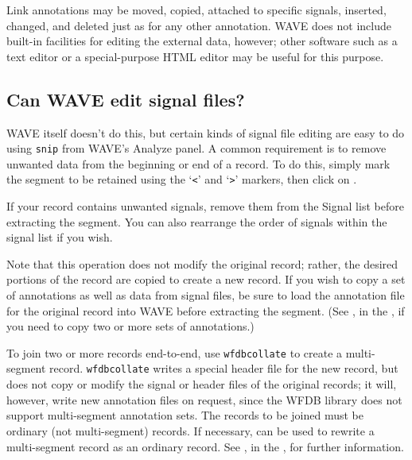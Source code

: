 \documentclass[twoside]{book}
\newcommand{\button}[1]{\cornersize{2}\ovalbox{\rule[-.3mm]{0cm}{2.5mm}\small\sf ~#1~}}
\newcommand{\WAVE}{{\sf WAVE}\xspace}
\begin{document}
Link annotations may be moved, copied, attached to specific signals,
inserted, changed, and deleted just as for any other annotation.
\WAVE{} does not include built-in facilities for editing the external
data, however;  other software such as a text editor or a
special-purpose HTML editor may be useful for this purpose.

\subsection{Can \WAVE{} edit signal files?}

\WAVE{} itself doesn't do this, but certain kinds of signal file editing are
easy to do using {\tt snip} from \WAVE{}'s {\sf Analyze} panel.  A common
requirement is to remove unwanted data from the beginning or end of a record.
To do this, simply mark the segment to be retained using the `{\tt <}' and
`{\tt >}' markers, then click on \button{Extract segment}.

If your record contains unwanted signals, remove them from the {\sf Signal
list} before extracting the segment.  You can also rearrange the order of
signals within the signal list if you wish.

Note that this operation does not modify the original record;  rather, the
desired portions of the record are copied to create a new record.  If you
wish to copy a set of annotations as well as data from signal files, be sure
to load the annotation file for the original record into \WAVE{} before
extracting the segment.  (See
, in the
,
if you need to copy two or more sets of annotations.)

To join two or more records end-to-end, use {\tt wfdbcollate} to create
a multi-segment record.  {\tt wfdbcollate} writes a special header file
for the new record, but does not copy or modify the signal
or header files of the original records;  it will, however, write
new annotation files on request, since the WFDB library does not support
multi-segment annotation sets.  The records to be joined must be
ordinary (not multi-segment) records.  If necessary,
can be used to rewrite a multi-segment record as an ordinary record.  See
, in the 
,
for further information.
\end{document}
